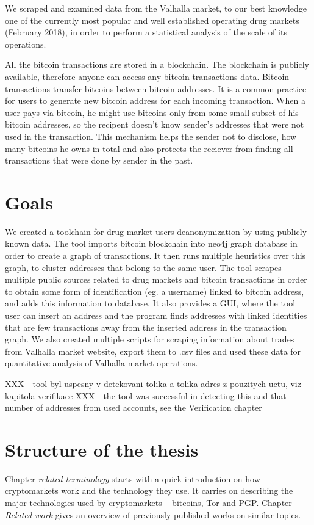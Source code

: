 \documentclass[
  digital, %
  table,   %
  lof,     %
  lot,     %
  oneside
]{fithesis3}
\begin{document}
We scraped and examined data from the Valhalla market,
 to our best knowledge one of the currently most popular and well established operating drug markets (February 2018),
in order to perform a statistical analysis of the scale of its operations.

All the bitcoin transactions are stored in a blockchain. The blockchain is
publicly available, therefore anyone can access any bitcoin transactions data.
Bitcoin transactions transfer bitcoins between bitcoin addresses. It is a common practice for users
to generate new bitcoin address for each incoming transaction.
When a user pays via bitcoin, he might use bitcoins only from some small subset of his bitcoin addresses,
so the recipent doesn't know sender's addresses that were not used in the transaction.
This mechanism helps the sender not to disclose, how many bitcoins he owns in total and also
protects the reciever from finding all transactions that were done by sender in the past.

\section{Goals}

We created a toolchain for drug market users deanonymization by using publicly known data.
The tool imports bitcoin blockchain into neo4j graph database in order to create a graph of transactions.
It then runs multiple heuristics over this graph, to cluster addresses that belong to the same user.
The tool scrapes multiple public sources related to drug markets and bitcoin transactions in order
to obtain some form of identification (eg. a username) linked to bitcoin address, and adds this information to database.
It also provides a GUI, where the tool user can insert an address and the program finds addresses with linked identities
that are few transactions away from the inserted address in the transaction graph.
We also created multiple scripts for scraping information about trades from Valhalla market website, 
export them to .csv files and used these data for quantitative analysis of Valhalla market operations.

XXX - tool byl uspesny v detekovani tolika a tolika adres z pouzitych uctu, viz kapitola verifikace
XXX - the tool was successful in detecting this and that number of addresses from used accounts, see the Verification chapter

\section{Structure of the thesis}
Chapter \emph{related terminology} starts with a quick introduction
on how cryptomarkets work and the technology they use.
It carries on describing the major technologies used by cryptomarkets -- bitcoins, Tor and PGP.
Chapter \emph{Related work} gives an overview of previously published works on similar topics. 
\end{document}
